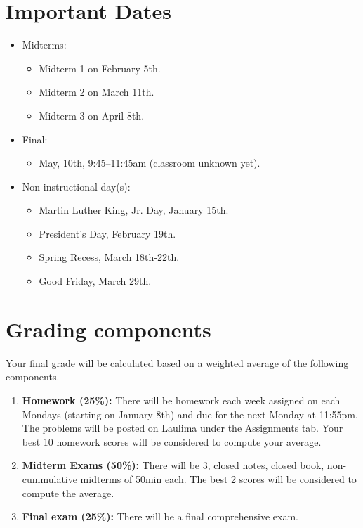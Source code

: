 \documentclass[12pt]{amsart}
\begin{document}
\section*{Important Dates}

	\begin{itemize}
	\item Midterms:
		\begin{itemize}
		\item Midterm 1 on February 5th.
		\item Midterm 2 on March 11th.
		\item Midterm 3 on April 8th.
		\end{itemize}
	\item Final:
		\begin{itemize}
		\item May, 10th, 9:45--11:45am (classroom unknown yet).
		\end{itemize}
	\item Non-instructional day(s):
		\begin{itemize}
		\item Martin Luther King, Jr. Day, January 15th.
		\item President's Day, February 19th.
		\item Spring Recess, March 18th-22th.
		\item Good Friday, March 29th.
		\end{itemize}
	\end{itemize}

\section*{Grading components}
Your final grade will be calculated based on a weighted average of the following components.

\begin{enumerate}
\item{\bf Homework (25\%):} There will be homework each week assigned on each Mondays (starting on January 8th) and due for the next Monday at 11:55pm. The problems will be posted on Laulima under the Assignments tab. Your best 10 homework scores will be considered to compute your average.
\item {\bf Midterm Exams (50\%):} There will be 3, closed notes, closed book, non-cummulative midterms of 50min each. The best 2 scores will be considered to compute the average.
\item {\bf Final exam (25\%):} There will be a final comprehensive exam.
\end{enumerate}
\end{document}
